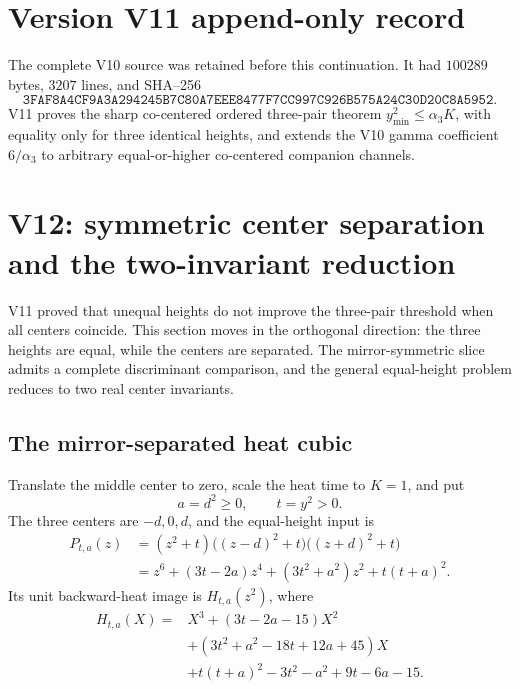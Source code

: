 \documentclass[11pt]{article}
\theoremstyle{definition}
\theoremstyle{remark}
\begin{document}
\section*{Version V11 append-only record}
The complete V10 source was retained before this continuation.  It had
\(100289\) bytes, \(3207\) lines, and SHA--256
\[
 \texttt{3FAF8A4CF9A3A294245B7C80A7EEE8477F7CC997C926B575A24C30D20C8A5952}.
\]
V11 proves the sharp co-centered ordered three-pair theorem
\(y_{\min}^2\le\alpha_3K\), with equality only for three identical heights,
and extends the V10 gamma coefficient \(6/\alpha_3\) to arbitrary
equal-or-higher co-centered companion channels.




\section{V12: symmetric center separation and the two-invariant reduction}
\label{sec:grh-v12}

V11 proved that unequal heights do not improve the three-pair threshold
when all centers coincide.  This section moves in the orthogonal direction:
the three heights are equal, while the centers are separated.  The
mirror-symmetric slice admits a complete discriminant comparison, and the
general equal-height problem reduces to two real center invariants.

\subsection{The mirror-separated heat cubic}

Translate the middle center to zero, scale the heat time to \(K=1\), and
put
\[
 a=d^2\ge0,\qquad t=y^2>0.
 \tag{N12.1}
\]
The three centers are \(-d,0,d\), and the equal-height input is
\[
\begin{aligned}
 P_{t,a}(z)
 &=(z^2+t)\bigl((z-d)^2+t\bigr)\bigl((z+d)^2+t\bigr)\\
 &=z^6+(3t-2a)z^4+(3t^2+a^2)z^2+t(t+a)^2.
\end{aligned}
\tag{N12.2}
\]
Its unit backward-heat image is \(H_{t,a}(z^2)\), where
\[
\begin{aligned}
 H_{t,a}(X)
 ={}&X^3+(3t-2a-15)X^2\\
 &+(3t^2+a^2-18t+12a+45)X\\
 &+t(t+a)^2-3t^2-a^2+9t-6a-15.
\end{aligned}
\tag{N12.3}
\]
\end{document}
